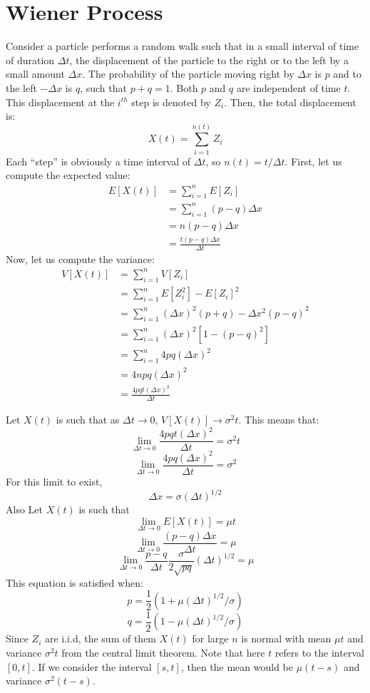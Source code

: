 \documentclass[12pt,letterpaper]{book}
\theoremstyle{definition}
\begin{document}
\section{Wiener Process}

Consider a particle performs a random walk such that in a small interval of time of duration $\Delta t$, the displacement of the particle to the right or to the left by a small amount $\Delta x$. The probability of the particle moving right by $\Delta x$ is $p$ and to the left $- \Delta x$ is $q$, such that $p+q = 1$. Both $p$ and $q$ are independent of time $t$. This displacement at the $i^{th}$ step is denoted by $Z_i$. Then, the total displacement is:
\[X(t) = \sum_{i = 1}^{n(t)} Z_i\]
Each ``step'' is obviously a time interval of $\Delta t$, so $n(t) = t / \Delta t$. First, let us compute the expected value:
\begin{align*}
  E[X(t)] &= \sum_{i = 1}^n E[Z_i]\\
          &= \sum_{i=1}^n (p-q) \Delta x \\
          &= n (p-q) \Delta x\\ 
          &= \frac{t(p-q) \Delta x}{\Delta t}
\end{align*}
Now, let us compute the variance:
\begin{align*}
  V[X(t)]  &= \sum_{i=1}^n V[Z_i] \\
           &= \sum_{i=1}^n E[Z_i^2] - E[Z_i]^2 \\
           &= \sum_{i=1}^n (\Delta x)^2 (p+q) - \Delta x^2 (p-q)^2\\
           &= \sum_{i=1}^n (\Delta x)^2 [1 - (p-q)^2]\\
           &= \sum_{i=1}^n4 pq (\Delta x)^2 \\
           &= 4 npq (\Delta x)^2 \\
           &= \frac{4 p q t (\Delta x)^2}{\Delta t}
\end{align*}

Let $X(t)$ is such that as $\Delta t \rightarrow 0$, $V[X(t)] \rightarrow \sigma^2t$. This means that:
\[\lim_{\Delta t \rightarrow 0} \frac{4pqt (\Delta x)^2}{\Delta t} = \sigma^2 t\]
\[\lim_{\Delta t \rightarrow 0} \frac{4pq (\Delta x)^2}{\Delta t} = \sigma^2\]
For this limit to exist, 
\[\Delta x = \sigma (\Delta t)^{1/2}\]
Also Let $X(t)$ is such that 
\[\lim_{\Delta t \rightarrow 0} E[X(t)] = \mu t\]
\[\lim_{\Delta t \rightarrow 0} \frac{(p-q) \Delta x}{\Delta t} = \mu\]
\[\lim_{\Delta t \rightarrow 0} \frac{p-q}{\Delta t} \frac{\sigma}{2\sqrt{pq}} (\Delta t)^{1/2} = \mu\]
This equation is satisfied when:
\[p = \frac{1}{2} (1 + \mu (\Delta t)^{1/2} / \sigma)\]
\[q = \frac{1}{2} (1 - \mu (\Delta t)^{1/2} / \sigma)\]
Since $Z_i$ are i.i.d, the sum of them $X(t)$ for large $n$ is normal with mean $\mu t$ and variance $\sigma^2 t$ from the central limit theorem. Note that here $t$ refers to the interval $[0,t]$. If we consider the interval $[s,t]$, then the mean would be $\mu(t-s)$ and variance $\sigma^2(t-s)$.
\end{document}

